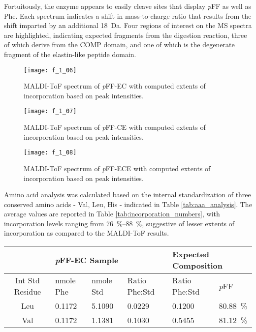 \begin{refsection}
Fortuitously, the enzyme appears to easily cleave sites that display \emph{p}FF
as well as Phe. Each spectrum indicates a shift in mass-to-charge ratio that
results from the shift imparted by an additional \SI{18}{\dalton}. Four regions
of interest on the MS spectra are highlighted, indicating expected fragments
from the digestion reaction, three of which derive from the COMP domain, and one
of which is the degenerate fragment of the elastin-like peptide domain.
\begin{figure}[h!] \centering \texttt{[image: f\_1\_06]}
    \caption{MALDI-ToF spectrum of \emph{p}FF-EC with computed extents of
incorporation based on peak intensities.} \label{fig:MALDI_spectrum_EC} \end{figure}
\begin{figure}[h!] \centering \texttt{[image: f\_1\_07]}
    \caption{MALDI-ToF spectrum of \emph{p}FF-CE with computed extents of
incorporation based on peak intensities.} \label{fig:MALDI_spectrum_CE} \end{figure}
\begin{figure}[h!] \centering \texttt{[image: f\_1\_08]}
    \caption{MALDI-ToF spectrum of \emph{p}FF-ECE with computed extents of
incorporation based on peak intensities.} \label{fig:MALDI_spectrum_ECE} \end{figure}
Amino acid analysis was calculated based on the internal standardization of
three conserved amino acids - Val, Leu, His - indicated in Table
\ref{tab:aaa_analysis}. The average values are reported in
Table \ref{tab:incorporation_numbers}, with incorporation levels ranging from
\SIrange{76}{88}{\percent}, suggestive of lesser extents of incorporation as
compared to the MALDI-ToF results. 
\begin{table}[h!]
    \centering
\begin{tabular}{ clllll }
  \hline
  &
  \multicolumn{3}{l}{\emph{p}FF-EC Sample} &
  \multicolumn{2}{l}{Expected Composition} \\
  \hline
  Int Std Residue & nmole Phe & nmole Std & Ratio Phe:Std & Ratio Phe:Std& \emph{p}FF \\
  Leu & 0.1172 & 5.1090 & 0.0229 & 0.1200 & \SI{80.88}{\percent} \\
  Val & 0.1172 & 1.1381 & 0.1030 & 0.5455 & \SI{81.12}{\percent} \\

\end{tabular}
\end{table}
\end{refsection}
